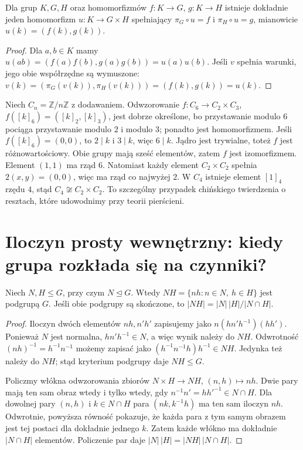 \begin{stwierdzenie}
\label{aa:st:product-universal}
Dla grup $K,G,H$ oraz homomorfizmów $f:K\to G$,
$g:K\to H$ istnieje dokładnie jeden homomorfizm
$u:K\to G\times H$ spełniający $\pi_G\circ u=f$
i $\pi_H\circ u=g$, mianowicie $u(k)=(f(k),g(k))$.
\end{stwierdzenie}
\begin{proof}
Dla $a,b\in K$ mamy
$u(ab)=(f(a)f(b),g(a)g(b))=u(a)u(b)$.
Jeśli $v$ spełnia warunki, jego obie współrzędne są wymuszone:
$v(k)=(\pi_G(v(k)),\pi_H(v(k)))=(f(k),g(k))=u(k)$.
\end{proof}

\begin{przyklad}
Niech $C_n=\mathbb Z/n\mathbb Z$ z dodawaniem.
Odwzorowanie $f:C_6\to C_2\times C_3$,
$f([k]_6)=([k]_2,[k]_3)$, jest dobrze określone,
bo przystawanie modulo $6$ pociąga przystawanie
modulo $2$ i modulo $3$; ponadto jest homomorfizmem.
Jeśli $f([k]_6)=(0,0)$, to $2\mid k$ i $3\mid k$,
więc $6\mid k$. Jądro jest trywialne, toteż $f$ jest
różnowartościowy. Obie grupy mają sześć elementów,
zatem $f$ jest izomorfizmem.
Element $(1,1)$ ma rząd $6$.
Natomiast każdy element $C_2\times C_2$ spełnia
$2(x,y)=(0,0)$, więc ma rząd co najwyżej $2$.
W $C_4$ istnieje element $[1]_4$ rzędu $4$, stąd
$C_4\not\cong C_2\times C_2$.
To szczególny przypadek chińskiego twierdzenia o resztach,
które udowodnimy przy teorii pierścieni.
\end{przyklad}

\section{Iloczyn prosty wewnętrzny: kiedy grupa rozkłada się na czynniki?}
\begin{lemat}
\label{aa:lem:product-subgroups}
Niech $N,H\le G$, przy czym $N\trianglelefteq G$.
Wtedy $NH=\{nh:n\in N,\ h\in H\}$ jest podgrupą $G$.
Jeśli obie podgrupy są skończone, to
$|NH|=|N|\,|H|/|N\cap H|$.
\end{lemat}
\begin{proof}
Iloczyn dwóch elementów $nh,n'h'$ zapisujemy jako
$n(hn'h^{-1})(hh')$. Ponieważ $N$ jest normalna,
$hn'h^{-1}\in N$, a więc wynik należy do $NH$.
Odwrotność $(nh)^{-1}=h^{-1}n^{-1}$ możemy zapisać jako
$(h^{-1}n^{-1}h)h^{-1}\in NH$. Jedynka też należy do $NH$;
stąd kryterium podgrupy daje $NH\le G$.

Policzmy włókna odwzorowania zbiorów $N\times H\to NH$,
$(n,h)\mapsto nh$. Dwie pary mają ten sam obraz wtedy i tylko wtedy,
gdy $n^{-1}n'=hh'^{-1}\in N\cap H$.
Dla dowolnej pary $(n,h)$ i $k\in N\cap H$ para
$(nk,k^{-1}h)$ ma ten sam iloczyn $nh$.
Odwrotnie, powyższa równość pokazuje, że każda para
z tym samym obrazem jest tej postaci dla dokładnie jednego $k$.
Zatem każde włókno ma dokładnie $|N\cap H|$ elementów.
Policzenie par daje $|N|\,|H|=|NH|\,|N\cap H|$.
\end{proof}

